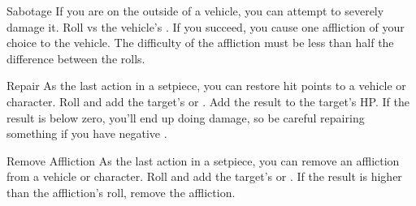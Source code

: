 \begin{describe}{Sabotage}
  If you are on the outside of a vehicle, you can attempt to severely damage it. Roll \stat{\statMental} vs the vehicle's . If you succeed, you cause one affliction of your choice to the vehicle. The difficulty of the affliction must be less than half the difference between the rolls.
\end{describe}

\hr

\begin{describe}{Repair}
  As the last action in a setpiece, you can restore hit points to a vehicle or character. Roll \stat{\statMental} and add the target's \stat{\statPhysical} or . Add the result to the target's HP. If the result is below zero, you'll end up doing damage, so be careful repairing something if you have negative \stat{\statMental}.
\end{describe}

\begin{describe}{Remove Affliction}
  As the last action in a setpiece, you can remove an affliction from a vehicle or character. Roll \stat{\statMental} and add the target's \stat{\statPhysical} or . If the result is higher than the affliction's  roll, remove the affliction.
\end{describe}
